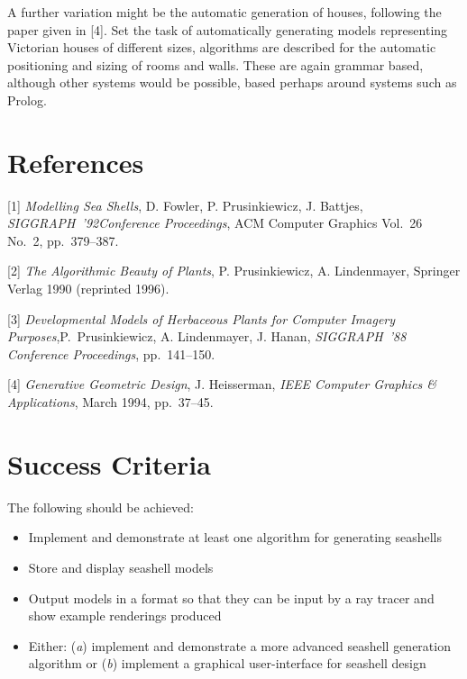 \documentclass[12pt]{article}
\begin{document}
A further variation might be the automatic generation of houses,
following the paper given in [4].  Set the task of automatically
generating models representing Victorian houses of different sizes,
algorithms are described for the automatic positioning and sizing of
rooms and walls. These are again grammar based, although other systems
would be possible, based perhaps around systems such as Prolog.


\section*{References}

\begin{description}

\item{[1]} \emph{Modelling Sea Shells}, D. Fowler, P. Prusinkiewicz,
J. Battjes, \emph{SIGGRAPH~'92\break Conference Proceedings}, ACM Computer
Graphics Vol.~26 No.~2, pp.~379--387.

\item{[2]} \emph{The Algorithmic Beauty of Plants}, P. Prusinkiewicz,
A. Lindenmayer, Springer Verlag 1990 (reprinted 1996).

\item{[3]} \emph{Developmental Models of Herbaceous Plants for
    Computer Imagery Purposes},\break P.~Prusinkiewicz, A. Lindenmayer, J.
  Hanan, \emph{SIGGRAPH~'88 Conference Proceedings}, pp.~141--150.

\item{[4]} \emph{Generative Geometric Design}, J. Heisserman, \emph{IEEE
Computer Graphics \& \break Applications}, March 1994, pp.~37--45.

\end{description}


\section*{Success Criteria}

The following should be achieved:

\begin{itemize}

\item Implement and demonstrate at least one algorithm for generating
seashells

\item Store and display seashell models

\item Output models in a format so that they can be input by a ray tracer and
show example renderings produced

\item Either: (\emph{a}) implement and demonstrate a more advanced seashell
generation algorithm or (\emph{b}) implement a graphical user-interface for
seashell design

\end{itemize}
\end{document}
